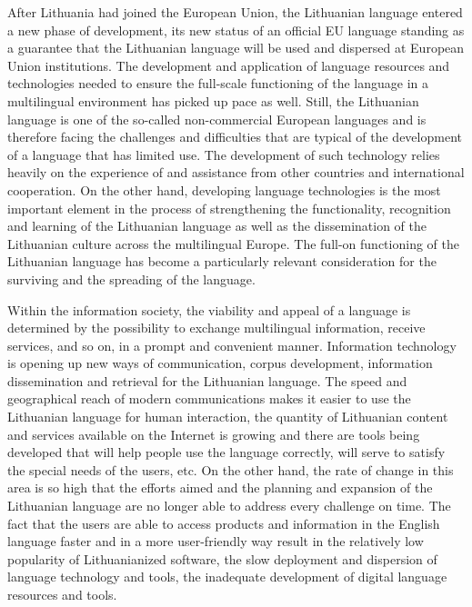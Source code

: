 \begin{multicols}{2}
After Lithuania had joined the European Union, the Lithuanian language entered a new phase of development, its new status of an official EU language standing as a guarantee that the Lithuanian language will be used and dispersed at European Union institutions. The development and application of language resources and technologies needed to ensure the full-scale functioning of the language in a multilingual environment has picked up pace as well. Still, the Lithuanian language is one of the so-called non-commercial European languages and is therefore facing the challenges and difficulties that are typical of the development of a language that has limited use. The development of such technology relies heavily on the experience of and assistance from other countries and international cooperation. On the other hand, developing language technologies is the most important element in the process of strengthening the functionality, recognition and learning of the Lithuanian language as well as the dissemination of the Lithuanian culture across the multilingual Europe. The full-on functioning of the Lithuanian language has become a particularly relevant consideration for the surviving and the spreading of the language.

Within the information society, the viability and appeal of a language is determined by the possibility to exchange multilingual information, receive services, and so on, in a prompt and convenient manner. Information technology is opening up new ways of communication, corpus development, information dissemination and retrieval for the Lithuanian language. The speed and geographical reach of modern communications makes it easier to use the Lithuanian language for human interaction, the quantity of Lithuanian content and services available on the Internet is growing and there are tools being developed that will help people use the language correctly, will serve to satisfy the special needs of the users, etc. On the other hand, the rate of change in this area is so high that the efforts aimed and the planning and expansion of the Lithuanian language are no longer able to address every challenge on time. The fact that the users are able to access products and information in the English language faster and in a more user-friendly way result in the relatively low popularity of Lithuanianized software, the slow deployment and dispersion of language technology and tools, the inadequate development of digital language resources and tools.


\end{multicols}

